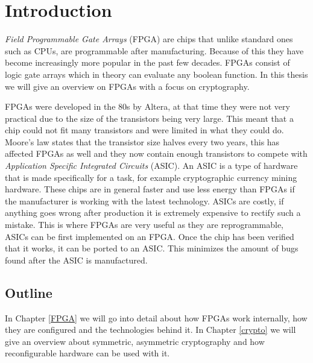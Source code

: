 \chapter{Introduction\label{intro}}

\textit{Field Programmable Gate Arrays} (FPGA) are chips that unlike standard
ones such as CPUs, are programmable after manufacturing. Because of this they
have become increasingly more popular in the past few decades. FPGAs consist of
logic gate arrays which in theory can evaluate any boolean function. In this
thesis we will give an overview on FPGAs with a focus on cryptography.

FPGAs were developed in the 80s by Altera, at that time they were not very
practical due to the size of the transistors being very large. This meant that
a chip could not fit many transistors and were limited in what they could do.
Moore's law states that the transistor size halves every two years, this has
affected FPGAs as well and they now contain enough transistors to compete with
\textit{Application Specific Integrated Circuits} (ASIC). An ASIC is a type of
hardware that is made specifically for a task, for example cryptographic
currency mining hardware. These chips are in general faster and use less energy
than FPGAs if the manufacturer is working with the latest technology. ASICs are
costly, if anything goes wrong after production it is extremely expensive to
rectify such a mistake. This is where FPGAs are very useful as they are
reprogrammable, ASICs can be first implemented on an FPGA. Once the chip has
been verified that it works, it can be ported to an ASIC. This minimizes the
amount of bugs found after the ASIC is manufactured.

\section{Outline\label{outline}}
In Chapter \ref{FPGA} we will go into detail about how FPGAs work internally,
how they are configured and the technologies behind it. In Chapter \ref{crypto}
we will give an overview about symmetric, asymmetric cryptography and how
reconfigurable hardware can be used with it.

